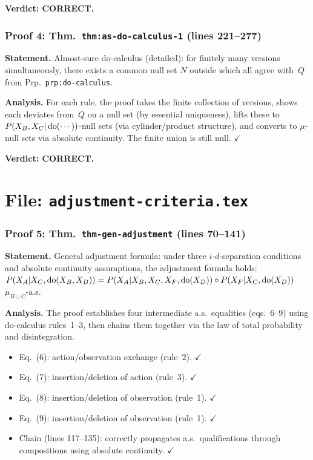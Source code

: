 \documentclass{article}
\begin{document}
\textbf{Verdict: CORRECT.}

\section{Proof 4: Thm.\ \texttt{thm:as-do-calculus-1} (lines 221--277)}

\textbf{Statement.} Almost-sure do-calculus (detailed): for finitely many
versions simultaneously, there exists a common null set $N$ outside which all
agree with~$Q$ from Prp.\ \texttt{prp:do-calculus}.

\textbf{Analysis.}
For each rule, the proof takes the finite collection of versions, shows each
deviates from~$Q$ on a null set (by essential uniqueness), lifts these to
$P(X_B,X_C|\operatorname{do}(\cdots))$-null sets (via cylinder/product structure), and
converts to $\mu$-null sets via absolute continuity.
The finite union is still null.  $\checkmark$

\textbf{Verdict: CORRECT.}

\part*{File: \texttt{adjustment-criteria.tex}}

\section{Proof 5: Thm.\ \texttt{thm-gen-adjustment} (lines 70--141)}

\textbf{Statement.} General adjustment formula: under three $i$-$d$-separation
conditions and absolute continuity assumptions, the adjustment formula holds:
$P(X_A|X_C,\operatorname{do}(X_B,X_D)) = P(X_A|X_B,X_C,X_F,\operatorname{do}(X_D))\circ P(X_F|X_C,\operatorname{do}(X_D))$
$\mu_{B\cup C}$-a.s.

\textbf{Analysis.}
The proof establishes four intermediate a.s.\ equalities (eqs.\ 6--9) using
do-calculus rules~1--3, then chains them together via the law of total probability
and disintegration.
\begin{itemize}
  \item Eq.\ (6): action/observation exchange (rule~2).  $\checkmark$
  \item Eq.\ (7): insertion/deletion of action (rule~3).  $\checkmark$
  \item Eq.\ (8): insertion/deletion of observation (rule~1).  $\checkmark$
  \item Eq.\ (9): insertion/deletion of observation (rule~1).  $\checkmark$
  \item Chain (lines 117--135): correctly propagates a.s.\ qualifications
    through compositions using absolute continuity.  $\checkmark$
\end{itemize}
\end{document}
